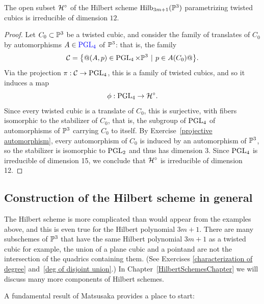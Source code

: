 \begin{proposition}
\label{hilb of twisted cubics}
The open subset $\mathcal H^\circ$ of the Hilbert scheme $\operatorname{Hilb}_{3m+1}({\mathbb P}^3)$
para\-metrizing twisted cubics is irreducible of dimension $12$.
\unif
\end{proposition}

\begin{proof}
Let $C_0 \subset {\mathbb P}^3$ be a twisted cubic, and consider the family
%
of translates of $C_0$ by automorphisms $A \in
\blue{\PGL_4}
$ of ${\mathbb P}^3$:
that is, the family
$$
\cC = \bigl\{@(A, p) \in \PGL_4 \times \PP^3 \; \mid \; p \in A(C_0)@\bigr\}.
$$
Via the projection $\pi : \mathcal C \to \operatorname{PGL}_4$, this is a family of twisted
cubics, and so it induces a map
$$
\phi : \operatorname{PGL}_4 \to \mathcal H^\circ.
$$
Since every twisted cubic is a translate of $C_0$, this is surjective,
with fibers isomorphic to the stabilizer of $C_0$, that is, the subgroup
of $\operatorname{PGL}_4$ of automorphisms of ${\mathbb P}^3$ carrying $C_0$ to itself. By
Exercise~\ref{projective automorphism}, every automorphism of $C_{0}$ is
induced by an automorphism of ${\mathbb P}^{3}$, so the stabilizer is isomorphic
to $\operatorname{PGL}_2$ and  thus has dimension 3. Since $\operatorname{PGL}_4$ is irreducible of
dimension 15, we conclude that $\mathcal H^\circ$ is irreducible of dimension 12.
\end{proof}

\subsection{Construction of the Hilbert scheme in general}
\label{hilb construction}

The Hilbert scheme is more complicated than would appear from the examples
above, and this is even true
for the Hilbert polynomial $3m+1$. There are many subschemes of ${\mathbb P}^3$
that have the same Hilbert polynomial $3m+1$ as a twisted cubic\emdash
for example, the union of a plane cubic and a point\emdash and are
not the intersection of the quadrics containing them. (See Exercises
\ref{characterization of degree} and~\ref{deg of disjoint union}.) In
Chapter~\ref{HilbertSchemesChapter} we will discuss many more components
of Hilbert schemes.

A fundamental result of
Matsusaka provides a place to start:

